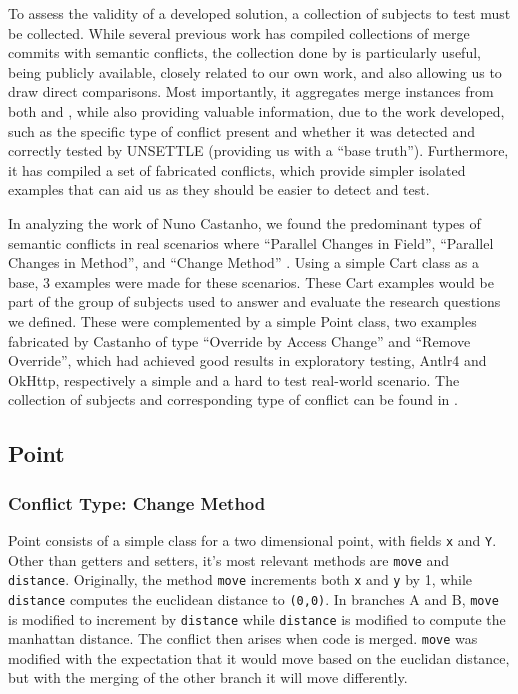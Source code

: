 To assess the validity of a developed solution, a collection of subjects to test must be collected. While several previous work has compiled collections of merge commits with semantic conflicts, the collection done by \citet{kn:nuno} is particularly useful, being publicly available, closely related to our own work, and also allowing us to draw direct comparisons. Most importantly, it aggregates merge instances from both \citet{kn:leuson} and \citet{kn:safemerge}, while also providing valuable information, due to the work developed, such as the specific type of conflict present and whether it was detected and correctly tested by UNSETTLE (providing us with a ``base truth''). Furthermore, it has compiled a set of fabricated conflicts, which provide simpler isolated examples that can aid us as they should be easier to detect and test.

In analyzing the work of Nuno Castanho, we found the predominant types of semantic conflicts in real scenarios where ``Parallel Changes in Field'', ``Parallel Changes in Method'', and ``Change Method'' \cite{kn:nuno}.  Using a simple Cart class as a base, 3 examples were made for these scenarios.
These Cart examples would be part of the group of subjects used to answer and evaluate the research questions we defined. These were complemented by a simple Point class, two examples fabricated by Castanho of type ``Override by Access Change'' and ``Remove Override'', which had achieved good results in exploratory testing, Antlr4 and OkHttp, respectively a simple and a hard to test real-world scenario.
The collection of subjects and corresponding type of conflict can be found in .


\subsection{Point}

\subsubsection{Conflict Type: Change Method}

Point consists of a simple class for a two dimensional point, with fields \texttt{x} and \texttt{Y}.
Other than getters and setters, it's most relevant methods are \texttt{move} and \texttt{distance}.
Originally, the method \texttt{move} increments both \texttt{x} and \texttt{y} by 1, while \texttt{distance} computes the euclidean distance to \texttt{(0,0)}.
In branches A and B, \texttt{move} is modified to increment by \texttt{distance} while \texttt{distance} is modified to compute
the manhattan distance.  The conflict then arises when code is merged.  \texttt{move} was modified with the expectation that it would move
based on the euclidan distance, but with the merging of the other branch it will move differently.


